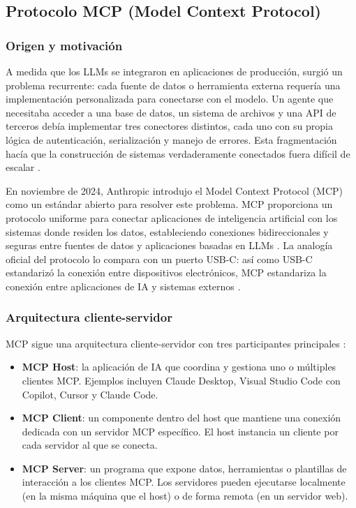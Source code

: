 \subsection{Protocolo MCP (Model Context Protocol)}

\subsubsection{Origen y motivación}

A medida que los LLMs se integraron en aplicaciones de producción, surgió un
problema recurrente: cada fuente de datos o herramienta externa requería una
implementación personalizada para conectarse con el modelo. Un agente que
necesitaba acceder a una base de datos, un sistema de archivos y una API de
terceros debía implementar tres conectores distintos, cada uno con su propia
lógica de autenticación, serialización y manejo de errores. Esta fragmentación
hacía que la construcción de sistemas verdaderamente conectados fuera difícil de
escalar \citep{anthropic2024mcp}.

En noviembre de 2024, Anthropic introdujo el Model Context Protocol (MCP) como
un estándar abierto para resolver este problema. MCP proporciona un protocolo
uniforme para conectar aplicaciones de inteligencia artificial con los sistemas
donde residen los datos, estableciendo conexiones bidireccionales y seguras
entre fuentes de datos y aplicaciones basadas en LLMs
\citep{anthropic2024mcp}. La analogía oficial del protocolo lo compara con un
puerto USB-C: así como USB-C estandarizó la conexión entre dispositivos
electrónicos, MCP estandariza la conexión entre aplicaciones de IA y sistemas
externos \citep{mcpspec2024}.

\subsubsection{Arquitectura cliente-servidor}

MCP sigue una arquitectura cliente-servidor con tres participantes principales
\citep{mcpspec2024}:

\begin{itemize}
    \item \textbf{MCP Host}: la aplicación de IA que coordina y gestiona uno o
    múltiples clientes MCP. Ejemplos incluyen Claude Desktop, Visual Studio
    Code con Copilot, Cursor y Claude Code.

    \item \textbf{MCP Client}: un componente dentro del host que mantiene una
    conexión dedicada con un servidor MCP específico. El host instancia un
    cliente por cada servidor al que se conecta.

    \item \textbf{MCP Server}: un programa que expone datos, herramientas o
    plantillas de interacción a los clientes MCP. Los servidores pueden
    ejecutarse localmente (en la misma máquina que el host) o de forma remota
    (en un servidor web).
\end{itemize}

